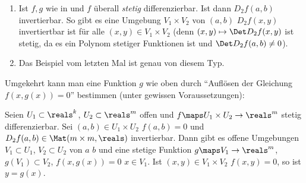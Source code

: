 \begin{bemerkungen*}
  \begin{enumerate}
    \item Ist \( f,g \) wie in  und \( f \) überall \emph{stetig} differenzierbar. Ist dann \( D_2 f(a,b) \) invertierbar. So gibt es eine Umgebung \( V_1\times V_2 \) von \( (a,b) \) \sd \( D_2f(x,y) \) invertiertbar ist für alle \( (x,y)\in V_1\times V_2 \) (denn \( (x,y)\mapsto \Det D_2f(x,y) \) ist stetig, da es ein Polynom stetiger Funktionen ist und \( \Det D_2 f(a,b)\neq 0 \)).
    \item Das Beispiel vom letzten Mal ist genau von diesem Typ.
  \end{enumerate}
\end{bemerkungen*}
Umgekehrt kann man eine Funktion \( g \) wie oben durch \enquote{Auflösen der Gleichung \( f(x,g(x))=0 \)} bestimmen (unter gewissen Voraussetzungen):
\begin{satz}\label{satz_von_der_impliziten_funktion}
  Seien \( U_1\subset \reals^k \), \( U_2\subset \reals^m \) offen und \( f\maps U_1\times U_2\to \reals^m \) stetig differenzierbar. Sei \( (a,b) \in U_1\times U_2 \) \sd \( f(a,b)=0 \) und \( D_2f(a,b)\in \Mat(m \times m,\reals) \) invertierbar. Dann gibt es offene Umgebungen \( V_1\subset U_1 \), \( V_2\subset U_2 \) von \( a \) \bzw \( b \) und eine stetige Funktion \( g\maps V_1\to \reals^m \), \( g(V_1)\subset V_2 \), \sd \( f(x,g(x))=0 \) \tforall  \( x\in V_1 \). Ist \( (x,y)\in V_1\times V_2 \) \sd \( f(x,y)=0 \), so ist \( y=g(x) \).
\end{satz}

